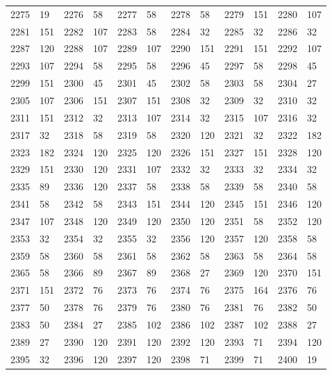 \begin{longtable}{llllllllllll}
2275 & 19&2276 &58&2277& 58&2278 &58&2279 &151&2280& 107\\
2281 & 151&2282 &107&2283& 58&2284 &32&2285 &32&2286& 32\\
2287 & 120&2288 &107&2289& 107&2290 &151&2291 &151&2292& 107\\
2293 & 107&2294 &58&2295& 58&2296 &45&2297 &58&2298& 45\\
2299 & 151&2300 &45&2301& 45&2302 &58&2303 &58&2304& 27\\
2305 & 107&2306 &151&2307& 151&2308 &32&2309 &32&2310& 32\\
2311 & 151&2312 &32&2313& 107&2314 &32&2315 &107&2316& 32\\
2317 & 32&2318 &58&2319& 58&2320 &120&2321 &32&2322& 182\\
2323 & 182&2324 &120&2325& 120&2326 &151&2327 &151&2328& 120\\
2329 & 151&2330 &120&2331& 107&2332 &32&2333 &32&2334& 32\\
2335 & 89&2336 &120&2337& 58&2338 &58&2339 &58&2340& 58\\
2341 & 58&2342 &58&2343& 151&2344 &120&2345 &151&2346& 120\\
2347 & 107&2348 &120&2349& 120&2350 &120&2351 &58&2352& 120\\
2353 & 32&2354 &32&2355& 32&2356 &120&2357 &120&2358& 58\\
2359 & 58&2360 &58&2361& 58&2362 &58&2363 &58&2364& 58\\
2365 & 58&2366 &89&2367& 89&2368 &27&2369 &120&2370& 151\\
2371 & 151&2372 &76&2373& 76&2374 &76&2375 &164&2376& 76\\
2377 & 50&2378 &76&2379& 76&2380 &76&2381 &76&2382& 50\\
2383 & 50&2384 &27&2385& 102&2386 &102&2387 &102&2388& 27\\
2389 & 27&2390 &120&2391& 120&2392 &120&2393 &71&2394& 120\\
2395 & 32&2396 &120&2397& 120&2398 &71&2399 &71&2400& 19\\
\bottomrule\end{longtable}
